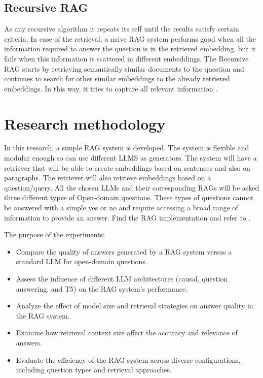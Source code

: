 \documentclass{wseas}
\begin{document}
\subsection{Recursive RAG}

As any recursive algorithm it repeats its self until the results
satisfy certain criteria. In case of the retrieval, a naive RAG system
performs good when all the information required to answer the
question is in the retrieved embedding, but it fails when this
information is scattered in different embeddings. The Recursive RAG starts 
by retrieving semantically similar documents to the question and continues 
to search for other similar embeddings to the already retrieved embeddings.
In this way, it tries to capture all relevant information \cite{website_PondhouseGuideOnAdvancedRAG}.

\section{Research methodology}

In this research, a simple RAG system is developed. The system is
flexible and modular enough so can use different LLMS as generators. The
system will have a retriever that will be able to create embeddings
based on sentences and also on paragraphs. The retriever will also
retrieve embeddings based on a question/query. All the chosen LLMs and
their corresponding RAGs will be asked three different types of Open-domain
questions. These types of questions cannot be answered with a simple 
yes or no and require accessing a broad range of information to provide an answer. 
Find the RAG implementation and refer to \cite{cite_github_solution}.

The purpose of the experiments: 
\begin{itemize}
  \item Compare the quality of answers generated by a RAG system versus a standard LLM for open-domain questions.
  \item Assess the influence of different LLM architectures (causal, question answering, and T5) on the RAG system's performance.
  \item Analyze the effect of model size and retrieval strategies on answer quality in the RAG system.
  \item Examine how retrieval context size affect the accuracy and relevance of answers.
  \item Evaluate the efficiency of the RAG system across diverse configurations, including question types and retrieval approaches.
\end{itemize}
\end{document}
